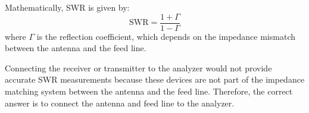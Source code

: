 Mathematically, SWR is given by:
\[
\text{SWR} = \frac{1 + \Gamma}{1 - \Gamma}
\]
where \(\Gamma\) is the reflection coefficient, which depends on the impedance mismatch between the antenna and the feed line.

Connecting the receiver or transmitter to the analyzer would not provide accurate SWR measurements because these devices are not part of the impedance matching system between the antenna and the feed line. Therefore, the correct answer is to connect the antenna and feed line to the analyzer.

